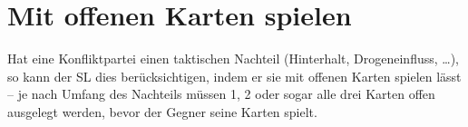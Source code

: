 \section{Mit offenen Karten spielen}
Hat eine Konfliktpartei einen taktischen Nachteil (Hinterhalt, Drogeneinfluss, \dots), so kann der SL dies berücksichtigen, indem er sie mit offenen Karten spielen lässt -- je nach Umfang des Nachteils müssen 1, 2 oder sogar alle drei Karten offen ausgelegt werden, bevor der Gegner seine Karten spielt.
